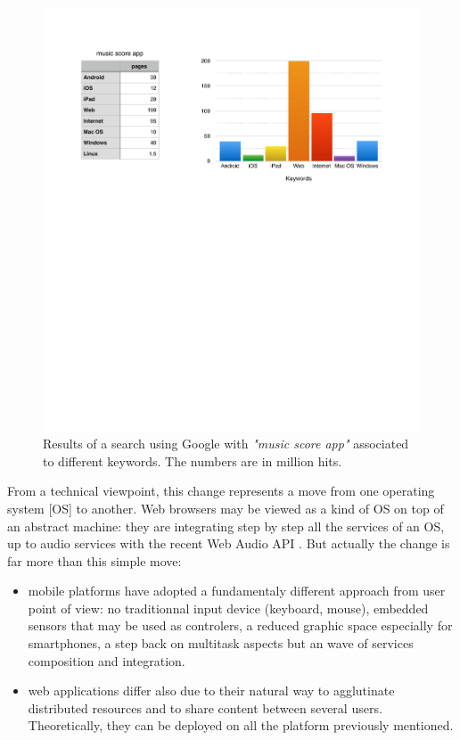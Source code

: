 \documentclass{article}
\begin{document}
\begin{figure}[h]
\centering
\includegraphics[width=0.90\columnwidth]{img/search}
\caption{Results of a search using Google with \emph{"music score app"} associated to different keywords. The numbers are in million hits.
\label{fig:search}}
\end{figure}

From a technical viewpoint, this change represents a move from one operating system [OS] to another. Web browsers may be viewed as a kind of OS on top of an abstract machine: they are integrating step by step all the services of an OS, up to audio services with the recent Web Audio API \cite{WebAudio}. But actually the change is far more than this simple move: 
\begin{itemize}
\item mobile platforms have adopted a fundamentaly different approach from user point of view: no traditionnal input device (keyboard, mouse), embedded sensors that may be used as controlers, a reduced graphic space especially for smartphones, a step back on multitask aspects but an wave of services composition and integration. 
\item web applications differ also due to their natural way to agglutinate distributed resources and to share content between several users. Theoretically, they can be deployed on all the platform previously mentioned.
\end{itemize}
\end{document}
